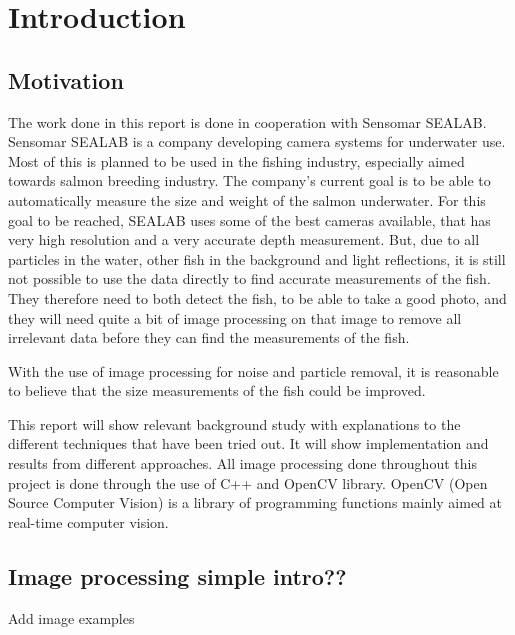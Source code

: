 \section{Introduction}\label{introduction}

\subsection{Motivation}\label{motivation}
The work done in this report is done in cooperation with Sensomar SEALAB.
Sensomar SEALAB is a company developing camera systems for underwater use. Most of this is planned to be used in the fishing industry, especially aimed towards salmon breeding industry. The company's current goal is to be able to automatically measure the size and weight of the salmon underwater. For this goal to be reached, SEALAB uses some of the best cameras available, that has very high resolution and a very accurate depth measurement. But, due to all particles in the water, other fish in the background and light reflections, it is still not possible to use the data directly to find accurate measurements of the fish. They therefore need to both detect the fish, to be able to take a good photo, and they will need quite a bit of image processing on that image to remove all irrelevant data before they can find the measurements of the fish. 

With the use of image processing for noise and particle removal, it is reasonable to believe that the size measurements of the fish could be improved.

This report will show relevant background study with explanations to the different techniques that have been tried out. It will show implementation and results from different approaches. All image processing done throughout this project is done through the use of C++ and OpenCV library. OpenCV (Open Source Computer Vision) is a library of programming functions mainly aimed at real-time computer vision. \cite{website:opencv_wiki}


\subsection{Image processing simple intro??}

{\color{red}Add image examples}




